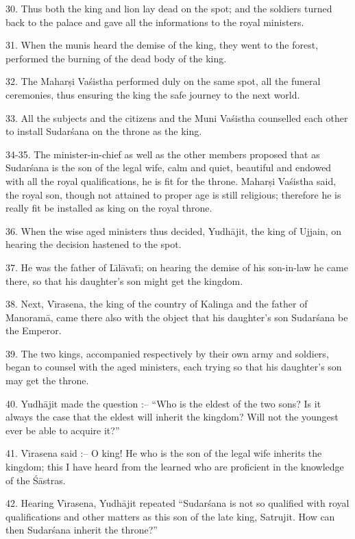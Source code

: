 30. Thus both the king and lion lay dead on the spot; and the soldiers turned back to the palace and gave all the informations to the royal ministers.

31. When the munis heard the demise of the king, they went to the forest, performed the burning of the dead body of the king.

32. The Mahar\d{s}i Va\'sistha performed duly on the same spot, all the funeral ceremonies, thus ensuring the king the safe journey to the next world.

33. All the subjects and the citizens and the Muni Va\'sistha counselled each other to install Sudar\'sana on the throne as the king.

34-35. The minister-in-chief as well as the other members proposed that as Sudar\'sana is the son of the legal wife, calm and quiet, beautiful and endowed with all the royal qualifications, he is fit for the throne. Mahar\d{s}i Va\'sistha said, the royal son, though not attained to proper age is still religious; therefore he is really fit be installed as king on the royal throne.

36. When the wise aged ministers thus decided, Yudh\=ajit, the king of Ujjain, on hearing the decision hastened to the spot.

37. He was the father of L\={\i}l\=avat\={\i}; on hearing the demise of his son-in-law he came there, so that his daughter's son might get the kingdom.

38. Next, V\={\i}rasena, the king of the country of Kalinga and the father of Manoram\=a, came there also with the object that his daughter's son Sudar\'sana be the Emperor.

39. The two kings, accompanied respectively by their own army and soldiers, began to counsel with the aged ministers, each trying so that his daughter's son may get the throne.

40. Yudh\=ajit made the question :-- ``Who is the eldest of the two sons? Is it always the case that the eldest will inherit the kingdom? Will not the youngest ever be able to acquire it?''

41. V\={\i}rasena said :-- O king! He who is the son of the legal wife inherits the kingdom; this I have heard from the learned who are proficient in the knowledge of the \'S\=astras.

42. Hearing V\={\i}rasena, Yudh\=ajit repeated ``Sudar\'sana is not so qualified with royal qualifications and other matters as this son of the late king, Satrujit. How can then Sudar\'sana inherit the throne?''

